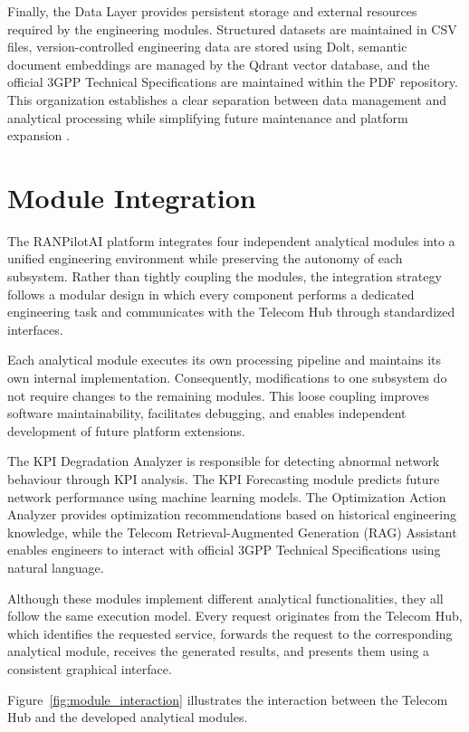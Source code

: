 Finally, the Data Layer provides persistent storage and external resources required by the engineering modules. Structured datasets are maintained in CSV files, version-controlled engineering data are stored using Dolt, semantic document embeddings are managed by the Qdrant vector database, and the official 3GPP Technical Specifications are maintained within the PDF repository. This organization establishes a clear separation between data management and analytical processing while simplifying future maintenance and platform expansion \cite{jurafsky2023}.
\section{Module Integration}

The RANPilotAI platform integrates four independent analytical modules into a unified engineering environment while preserving the autonomy of each subsystem. Rather than tightly coupling the modules, the integration strategy follows a modular design in which every component performs a dedicated engineering task and communicates with the Telecom Hub through standardized interfaces.

Each analytical module executes its own processing pipeline and maintains its own internal implementation. Consequently, modifications to one subsystem do not require changes to the remaining modules. This loose coupling improves software maintainability, facilitates debugging, and enables independent development of future platform extensions.

The KPI Degradation Analyzer is responsible for detecting abnormal network behaviour through KPI analysis. The KPI Forecasting module predicts future network performance using machine learning models. The Optimization Action Analyzer provides optimization recommendations based on historical engineering knowledge, while the Telecom Retrieval-Augmented Generation (RAG) Assistant enables engineers to interact with official 3GPP Technical Specifications using natural language.

Although these modules implement different analytical functionalities, they all follow the same execution model. Every request originates from the Telecom Hub, which identifies the requested service, forwards the request to the corresponding analytical module, receives the generated results, and presents them using a consistent graphical interface.

Figure~\ref{fig:module_interaction} illustrates the interaction between the Telecom Hub and the developed analytical modules.

